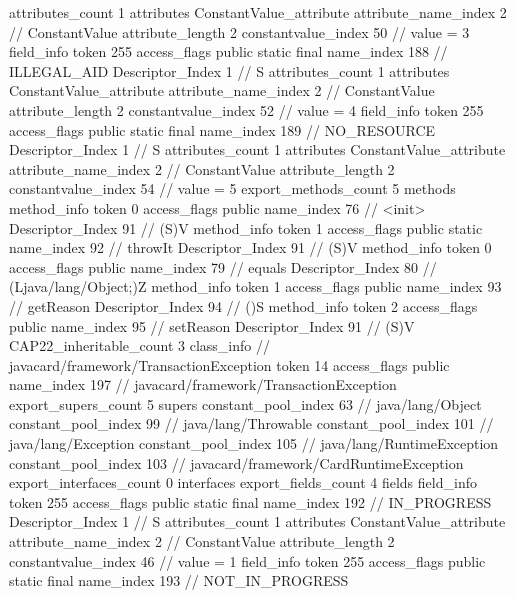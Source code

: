 {{{{{				attributes_count	1
				attributes {
				ConstantValue_attribute {
					attribute_name_index	2		// ConstantValue
					attribute_length	2
					constantvalue_index	50		// value = 3
				}
				}
			}
			field_info {
				token	255
				access_flags	public static final
				name_index	188		// ILLEGAL_AID
				Descriptor_Index	1		// S
				attributes_count	1
				attributes {
				ConstantValue_attribute {
					attribute_name_index	2		// ConstantValue
					attribute_length	2
					constantvalue_index	52		// value = 4
				}
				}
			}
			field_info {
				token	255
				access_flags	public static final
				name_index	189		// NO_RESOURCE
				Descriptor_Index	1		// S
				attributes_count	1
				attributes {
				ConstantValue_attribute {
					attribute_name_index	2		// ConstantValue
					attribute_length	2
					constantvalue_index	54		// value = 5
				}
				}
			}
			}
			export_methods_count	5
			methods {
				method_info {
					token	0
					access_flags	public
					name_index	76		// <init>
					Descriptor_Index	91		// (S)V
				}
				method_info {
					token	1
					access_flags	public static
					name_index	92		// throwIt
					Descriptor_Index	91		// (S)V
				}
				method_info {
					token	0
					access_flags	public
					name_index	79		// equals
					Descriptor_Index	80		// (Ljava/lang/Object;)Z
				}
				method_info {
					token	1
					access_flags	public
					name_index	93		// getReason
					Descriptor_Index	94		// ()S
				}
				method_info {
					token	2
					access_flags	public
					name_index	95		// setReason
					Descriptor_Index	91		// (S)V
				}
			}
			CAP22_inheritable_count	3
		}
		class_info {		// javacard/framework/TransactionException
			token	14
			access_flags	public
			name_index	197		// javacard/framework/TransactionException
			export_supers_count	5
			supers {
				constant_pool_index	63		// java/lang/Object
				constant_pool_index	99		// java/lang/Throwable
				constant_pool_index	101		// java/lang/Exception
				constant_pool_index	105		// java/lang/RuntimeException
				constant_pool_index	103		// javacard/framework/CardRuntimeException
			}
			export_interfaces_count	0
			interfaces {
			}
			export_fields_count	4
			fields {
			field_info {
				token	255
				access_flags	public static final
				name_index	192		// IN_PROGRESS
				Descriptor_Index	1		// S
				attributes_count	1
				attributes {
				ConstantValue_attribute {
					attribute_name_index	2		// ConstantValue
					attribute_length	2
					constantvalue_index	46		// value = 1
				}
				}
			}
			field_info {
				token	255
				access_flags	public static final
				name_index	193		// NOT_IN_PROGRESS
}}}}}
